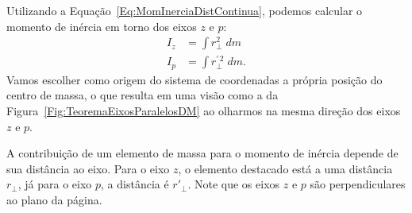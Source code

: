 Utilizando a Equação~\eqref{Eq:MomInerciaDistContinua}, podemos calcular o momento de inércia em torno dos eixos $z$ e $p$:
\begin{align}
    I_z &= \int r_\perp^2 \;dm \\
    I_p &= \int r_\perp^{\prime \, 2} \;dm. \label{Eq:TeorEixosParalelosDefIp}
\end{align}
%
Vamos escolher como origem do sistema de coordenadas a própria posição do centro de massa, o que resulta em uma visão como a da Figura~\ref{Fig:TeoremaEixosParalelosDM} ao olharmos na mesma direção dos eixos $z$ e $p$. 

\begin{marginfigure}[2cm]
\centering
{}
\caption{A contribuição de um elemento de massa para o momento de inércia depende de sua distância ao eixo. Para o eixo $z$, o elemento destacado está a uma distância $r_\perp$, já para o eixo $p$, a distância é $r'_\perp$. Note que os eixos $z$ e $p$ são perpendiculares ao plano da página.\label{Fig:TeoremaEixosParalelosDM}}
\end{marginfigure}

